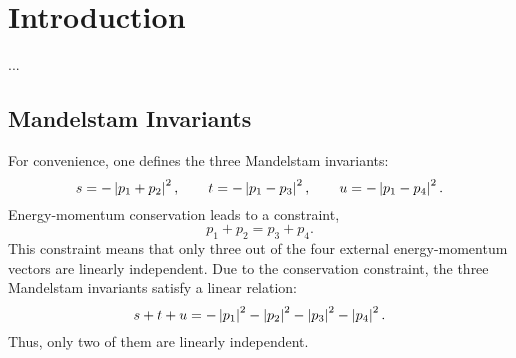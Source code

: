\chapter{Introduction}
...
\section{Mandelstam Invariants}
For convenience, one defines the three Mandelstam invariants:
\begin{equation}
	s = -\left\lvert p_{1} + p_{2} \right\rvert^{2}, \qquad t = -\left\lvert p_{1} - p_{3} \right\rvert^{2}, \qquad u = -\left\lvert p_{1} - p_{4} \right\rvert^{2}. 
\end{equation}
Energy-momentum conservation leads to a constraint,
\begin{equation}
	p_{1} + p_{2} = p_{3} + p_{4}.
\end{equation}
This constraint means that only three out of the four external energy-momentum vectors are linearly independent. Due to the conservation constraint, the three Mandelstam invariants satisfy a linear relation:
\begin{equation}
	s + t + u = -\left\lvert p_{1} \right\rvert^{2} - \left\lvert p_{2} \right\rvert^{2} - \left\lvert p_{3} \right\rvert^{2} - \left\lvert p_{4} \right\rvert^{2}.
	\label{eq:stu_slow}
\end{equation}
Thus, only two of them are linearly independent.
